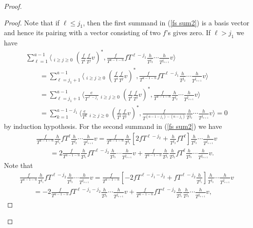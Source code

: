 \begin{proof}
\begin{proof}
Note that if $\ell \leq j_1$, then the first summand in (\ref{fs sum2}) is a basis vector and hence its pairing with a vector consisting of two $f$'s gives zero. If $\ell > j_1$ we have
\begin{gather*}
\sum_{\ell=1}^{a-1} \bigg\langle \mathop{\sum_{i+j=a-1-\ell}}_{i\geq j\geq 0} \left(\frac{f}{T^i}\frac{f}{T^j}v\right)^*, \frac{f}{T^{a-1-n}} fT^{\ell-j_1} \frac{h}{T^{j_2}} \cdots \frac{h}{T^{j_{s+1}}} v \bigg\rangle\\
\qquad{} = \sum_{\ell=j_1+1}^{a-1} \bigg\langle \mathop{\sum_{i+j=a-1-\ell}}_{i\geq j\geq 0} \left(\frac{f}{T^i}\frac{f}{T^j}v\right)^*, \frac{f}{T^{a-1-n}} fT^{\ell-j_1} \frac{h}{T^{j_2}} \cdots \frac{h}{T^{j_{s+1}}} v \bigg\rangle \\
\qquad{} = \sum_{\ell=j_1+1}^{a-1} \bigg\langle \frac{e}{T^{\ell-j_1}} \mathop{\sum_{i+j=a-1-\ell}}_{i\geq j\geq 0} \left(\frac{f}{T^i}\frac{f}{T^j}v\right)^*, \frac{f}{T^{a-1-n}} \frac{h}{T^{j_2}} \cdots \frac{h}{T^{j_{s+1}}} v \bigg\rangle \\
\qquad{} = \sum_{k=1}^{a-1-j_1} \bigg\langle \frac{e}{T^{k}} \mathop{\sum_{i+j=a-1-j_1 - k}}_{i\geq j\geq 0} \left(\frac{f}{T^i}\frac{f}{T^j}v\right)^*, \frac{f}{T^{(a-1-j_1)-(n-j_1)}} \frac{h}{T^{j_2}} \cdots \frac{h}{T^{j_{s+1}}} v \bigg\rangle = 0
\end{gather*}
by induction hypothesis. For the second summand in (\ref{fs sum2}) we have
\begin{gather}
\frac{f}{T^{a-1-n}} \frac{h}{T^{j_1}} fT^{\ell} \frac{h}{T^{j_2}} \cdots \frac{h}{T^{j_{s+1}}} v = \frac{f}{T^{a-1-n}} \frac{h}{T^{j_1}} \left[ 2fT^{\ell-j_2} + \frac{h}{T^{j_2}} fT^{\ell} \right] \frac{h}{T^{j_3}} \cdots \frac{h}{T^{j_{s+1}}} v \nonumber \\
\qquad{} = 2 \frac{f}{T^{a-1-n}} \frac{h}{T^{j_1}} fT^{\ell-j_2} \frac{h}{T^{j_3}} \cdots \frac{h}{T^{j_{s+1}}} v + \frac{f}{T^{a-1-n}} \frac{h}{T^{j_1}} \frac{h}{T^{j_2}} fT^{\ell} \frac{h}{T^{j_3}} \cdots \frac{h}{T^{j_{s+1}}} v. \label{2f}
\end{gather}
Note that
\begin{gather*}
\frac{f}{T^{a-1-n}} \frac{h}{T^{j_1}} fT^{\ell-j_2} \frac{h}{T^{j_3}} \cdots \frac{h}{T^{j_{s+1}}} v = \frac{f}{T^{a-1-n}} \left[ -2 fT^{\ell-j_1-j_2} + fT^{\ell-j_2} \frac{h}{T^{j_1}} \right] \frac{h}{T^{j_3}} \cdots \frac{h}{T^{j_{s+1}}} v \\
\qquad{} = -2 \frac{f}{T^{a-1-n}} fT^{\ell-j_1-j_2} \frac{h}{T^{j_3}} \cdots \frac{h}{T^{j_{s+1}}} v + \frac{f}{T^{a-1-n}} fT^{\ell-j_2} \frac{h}{T^{j_1}} \frac{h}{T^{j_3}} \cdots \frac{h}{T^{j_{s+1}}} v,

\end{gather*}
\end{proof}
\end{proof}
